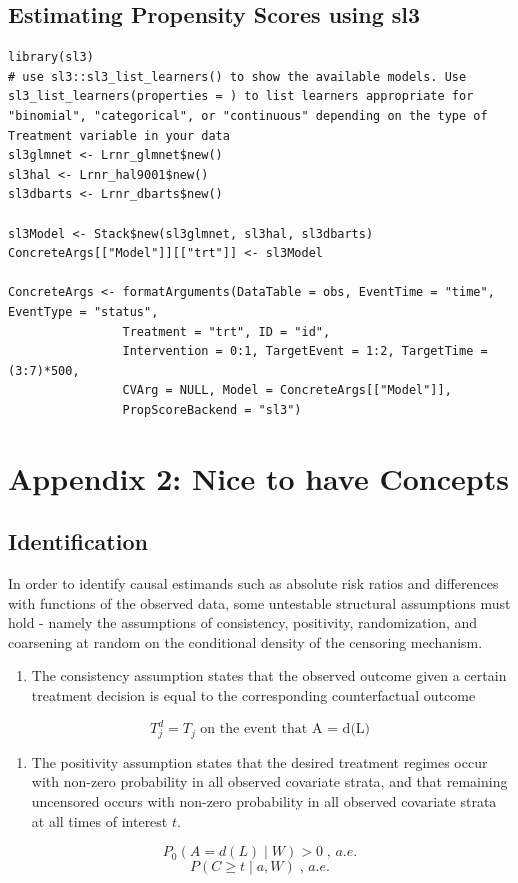 \documentclass{report}
\newcommand{\1}{\ensuremath{\mathbf{1}}}
\renewcommand{\L}{\ensuremath{W}}
\begin{document}
\subsection{Estimating Propensity Scores using sl3}
\label{sec:org247d5df}

\begin{lstlisting}
library(sl3)
# use sl3::sl3_list_learners() to show the available models. Use sl3_list_learners(properties = ) to list learners appropriate for "binomial", "categorical", or "continuous" depending on the type of Treatment variable in your data
sl3glmnet <- Lrnr_glmnet$new()
sl3hal <- Lrnr_hal9001$new()
sl3dbarts <- Lrnr_dbarts$new()

sl3Model <- Stack$new(sl3glmnet, sl3hal, sl3dbarts)
ConcreteArgs[["Model"]][["trt"]] <- sl3Model

ConcreteArgs <- formatArguments(DataTable = obs, EventTime = "time", EventType = "status", 
				Treatment = "trt", ID = "id", 
				Intervention = 0:1, TargetEvent = 1:2, TargetTime = (3:7)*500, 
				CVArg = NULL, Model = ConcreteArgs[["Model"]], 
				PropScoreBackend = "sl3")
\end{lstlisting}


\section{Appendix 2: Nice to have Concepts}
\label{sec:org19ac78a}

\subsection{Identification}
\label{identification}
In order to identify causal estimands such as absolute risk ratios and differences with functions of the observed data, some untestable structural assumptions must hold - namely the assumptions of consistency, positivity, randomization, and coarsening at random on the conditional density of the censoring mechanism. 


\begin{enumerate}
\item The consistency assumption states that the observed outcome given a certain treatment decision is equal to the corresponding counterfactual outcome
\end{enumerate}
\[ T^d_j = T_j \text{ on the event that A = d(L)} \]

\begin{enumerate}
\item The positivity assumption states that the desired treatment regimes occur with non-zero probability in all observed covariate strata, and that remaining uncensored occurs with non-zero probability in all observed covariate strata at all times of interest \(t\).
\end{enumerate}
\[ P_0\left( A = d(L) \mid \L \right) > 0 \;,\, a.e. \]
\[ P(C \geq t \mid a, \L) \;,\, a.e. \]
\end{document}
